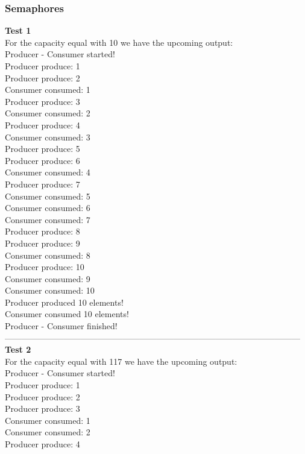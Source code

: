 \documentclass[14pt]{article}
\begin{document}
\subsubsection{Semaphores}
\textbf{Test 1}
\\For the capacity equal with 10 we have the upcoming output:
\\Producer - Consumer started!
\\Producer produce: 1
\\Producer produce: 2
\\Consumer consumed: 1
\\Producer produce: 3
\\Consumer consumed: 2
\\Producer produce: 4
\\Consumer consumed: 3
\\Producer produce: 5
\\Producer produce: 6
\\Consumer consumed: 4
\\Producer produce: 7
\\Consumer consumed: 5
\\Consumer consumed: 6
\\Consumer consumed: 7
\\Producer produce: 8
\\Producer produce: 9
\\Consumer consumed: 8
\\Producer produce: 10
\\Consumer consumed: 9
\\Consumer consumed: 10
\\Producer produced 10 elements!
\\Consumer consumed 10 elements!
\\Producer - Consumer finished!
\\---------------------------------------------------------------------------------------------------------
\\\textbf{Test 2}
\\For the capacity equal with 117 we have the upcoming output:
\\Producer - Consumer started!
\\Producer produce: 1
\\Producer produce: 2
\\Producer produce: 3
\\Consumer consumed: 1
\\Consumer consumed: 2
\\Producer produce: 4
\end{document}
